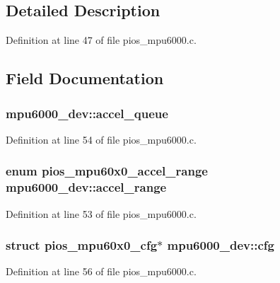 \subsection{Detailed Description}


Definition at line 47 of file pios\-\_\-mpu6000.\-c.



\subsection{Field Documentation}
\hypertarget{structmpu6000__dev_aab5a85c354860f95eabe5fdaac73504a}{
\subsubsection[{accel\-\_\-queue}]{ mpu6000\-\_\-dev\-::accel\-\_\-queue}}\label{structmpu6000__dev_aab5a85c354860f95eabe5fdaac73504a}


Definition at line 54 of file pios\-\_\-mpu6000.\-c.

\hypertarget{structmpu6000__dev_a97c53e87c85ad8b04916492833bedadb}{
\subsubsection[{accel\-\_\-range}]{\setlength{\rightskip}{0pt plus 5cm}enum {\bf pios\-\_\-mpu60x0\-\_\-accel\-\_\-range} mpu6000\-\_\-dev\-::accel\-\_\-range}}\label{structmpu6000__dev_a97c53e87c85ad8b04916492833bedadb}


Definition at line 53 of file pios\-\_\-mpu6000.\-c.

\hypertarget{structmpu6000__dev_a4a8e8aa9b09f9ce6dcb417ff154282bc}{
\subsubsection[{cfg}]{\setlength{\rightskip}{0pt plus 5cm}struct {\bf pios\-\_\-mpu60x0\-\_\-cfg}$\ast$ mpu6000\-\_\-dev\-::cfg}}\label{structmpu6000__dev_a4a8e8aa9b09f9ce6dcb417ff154282bc}


Definition at line 56 of file pios\-\_\-mpu6000.\-c.

